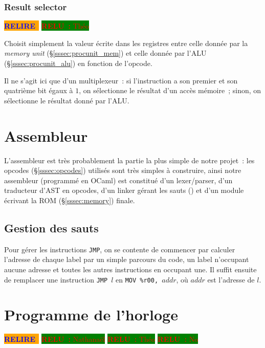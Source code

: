 \documentclass[11pt,a4paper]{article}
\newcommand{\relire}{\colorbox{orange}{\textcolor{blue}{\textbf{RELIRE}~}}}
\newcommand{\relu}[1]{\colorbox{green}{\textcolor{red}{\textbf{RELU~:} #1}}}
\begin{document}
\subsubsection{Result selector}

\relire
\relu{Théo}

Choisit simplement la valeur écrite dans les registres entre celle donnée par la \textit{memory unit} (§\ref{sssec:procunit_mem}) et celle donnée par l'ALU (§\ref{sssec:procunit_alu}) en fonction de l'opcode.

Il ne s'agit ici que d'un multiplexeur~: si l'instruction a son premier et son quatrième bit égaux à $1$, on sélectionne le résultat d'un accès mémoire~; sinon, on sélectionne le résultat donné par l'ALU.

\section{Assembleur} \label{sec:cas}

L'assembleur est très probablement la partie la plus simple de notre projet~: les opcodes (§\ref{sssec:opcodes}) utilisés sont très simples à construire, ainsi notre assembleur (programmé en OCaml) est constitué d'un lexer/parser, d'un traducteur d'AST en opcodes, d'un \og linker \fg{} gérant les sauts () et d'un module écrivant la ROM (§\ref{sssec:memory}) finale.

\subsection{Gestion des sauts}

Pour gérer les instructions \verb!JMP!, on se contente de commencer
par calculer l'adresse de chaque label par un simple parcours du code,
un label n'occupant aucune adresse et toutes les autres instructions
en occupant une. Il suffit ensuite de remplacer une instruction
\verb!JMP!~$l$ en \verb!MOV %r00, !$addr$, où $addr$ est l'adresse de
$l$.


\section{Programme de l'horloge} \label{sec:clock}

\relire
\relu{Nathanaël} \relu{Théo} \relu{No}
\end{document}
